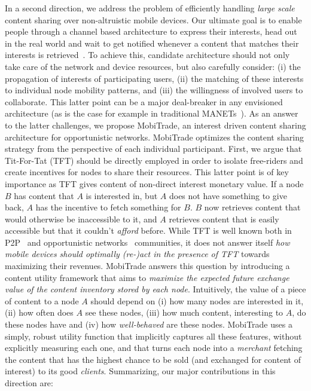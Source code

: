 In a second direction, we address the problem of efficiently handling \emph{large scale} content sharing over non-altruistic mobile devices. Our ultimate goal is to enable people through a channel based architecture to express their interests, head out in the real world and wait to get notified whenever a content that matches their interests is retrieved~\cite{CCN, MobiCent, IADTN, MoB, OptimalChannelChoice, ContentPlace, SocialCast2, SocialCast, BlueTorrent, TACODTN, Peoplenet}. To achieve this, candidate architecture should not only take care of the network and device resources, but also carefully consider: (i) the propagation of interests of participating users, (ii) the matching of these interests to individual node mobility patterns, and (iii) the willingness of involved users to collaborate. This latter point can be a major deal-breaker in any envisioned architecture (as is the case for example in traditional MANETs~\cite{NashEquilibria}). As an answer to the latter challenges, we propose MobiTrade, an interest driven content sharing architecture for opportunistic networks. MobiTrade optimizes the content sharing strategy from the perspective of each individual participant. First, we argue that Tit-For-Tat (TFT) should be directly employed in order to isolate free-riders and create incentives for nodes to share their resources. This latter point is of key importance as TFT gives content of non-direct interest monetary value. If a node $B$ has content that $A$ is interested in, but $A$ does not have something to give back, $A$ has the incentive to fetch something for $B$. $B$ now retrieves content that would otherwise be inaccessible to it, and $A$ retrieves content that is easily accessible but that it couldn't \emph{afford} before. While TFT is well known both in P2P~\cite{BitHoc} and opportunistic networks~\cite{BarterDTN} communities, it does not answer itself \emph{how mobile devices should optimally (re-)act in the presence of TFT} towards maximizing their revenues. MobiTrade answers this question by introducing a content utility framework that aims to \emph{maximize the expected future exchange value of the content inventory stored by each node}. Intuitively, the value of a piece of content to a node $A$ should depend on (i) how many nodes are interested in it, (ii) how often does $A$ see these nodes, (iii) how much content, interesting to $A$, do these nodes have and (iv) how \emph{well-behaved} are these nodes. MobiTrade uses a simply, robust utility function that implicitly captures all these features, without explicitly measuring each one, and that turns each node into a \emph{merchant} fetching the content that has the highest chance to be sold (and exchanged for content of interest) to its good \emph{clients}. Summarizing, our major contributions in this direction are:
